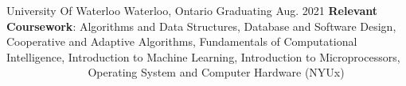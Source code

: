 \begin{siderulesEdu}
\begin{eduentries}
  \eduentry
    {\emph{\color{black}{Candidate of B.ASc: Honours Mechanical Engineering - Artificial Intelligence Option} }}
    {University Of Waterloo}
    {Waterloo, Ontario}
    {Graduating Aug. 2021}
    {\textbf{Relevant Coursework}:
    Algorithms and Data Structures, Database and Software Design, Cooperative and Adaptive Algorithms, Fundamentals of Computational Intelligence, Introduction to Machine Learning, Introduction to Microprocessors, $\>$ $\>$ $\>$ $\>$$\>$ $\>$ $\>$ $\>$$\>$ $\>$ $\>$ $\>$$\>$ $\>$ $\>$ $\>$ Operating System and Computer Hardware (NYUx)}
\end{eduentries}
\end{siderulesEdu}
